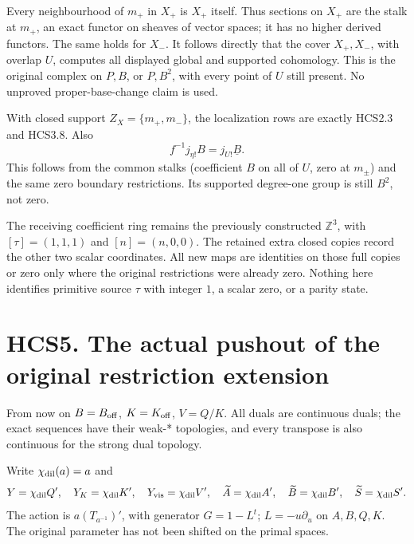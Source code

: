 Every neighbourhood of \(m_+\) in \(X_+\) is \(X_+\) itself. Thus
sections on \(X_+\) are the stalk at \(m_+\), an exact functor on
sheaves of vector spaces; it has no higher derived functors. The same
holds for \(X_-\). It follows directly that the cover \(X_+,X_-\), with
overlap \(U\), computes all displayed global and supported cohomology.
This is the original complex on \(P,B\), or \(P,B^2\), with every point
of \(U\) still present. No unproved proper-base-change claim is used.

With closed support \(Z_X=\{m_+,m_-\}\), the localization rows are
exactly HCS2.3 and HCS3.8. Also \[
f^{-1}j_{\eta!}B=j_{U!}\underline B.
\tag{HCS4.2}
\] This follows from the common stalks (coefficient \(B\) on all of
\(U\), zero at \(m_\pm\)) and the same zero boundary restrictions. Its
supported degree-one group is still \(B^2\), not zero.

The receiving coefficient ring remains the previously constructed
\(\mathbb Z^3\), with \([\tau]=(1,1,1)\) and \([n]=(n,0,0)\). The
retained extra closed copies record the other two scalar coordinates.
All new maps are identities on those full copies or zero only where the
original restrictions were already zero. Nothing here identifies
primitive source \(\tau\) with integer \(1\), a scalar zero, or a parity
state.

\section{HCS5. The actual pushout of the original restriction
extension}\label{hcs5.-the-actual-pushout-of-the-original-restriction-extension}

From now on \(B=B_{\rm off}\), \(K=K_{\rm off}\), \(V=Q/K\). All duals
are continuous duals; the exact sequences have their weak-* topologies,
and every transpose is also continuous for the strong dual topology.

Write \(\chi_{\rm dil}(a)=a\) and \[
Y=\chi_{\rm dil}Q',\quad
Y_K=\chi_{\rm dil}K',\quad
Y_{\rm vis}=\chi_{\rm dil}V',\quad
\widetilde A=\chi_{\rm dil}A',\quad
\widetilde B=\chi_{\rm dil}B',\quad
\widetilde S=\chi_{\rm dil}S'.
\] The action is \(a(T_{a^{-1}})'\), with generator \(G=1-L^t\);
\(L=-u\partial_u\) on \(A,B,Q,K\). The original parameter has not been
shifted on the primal spaces.

